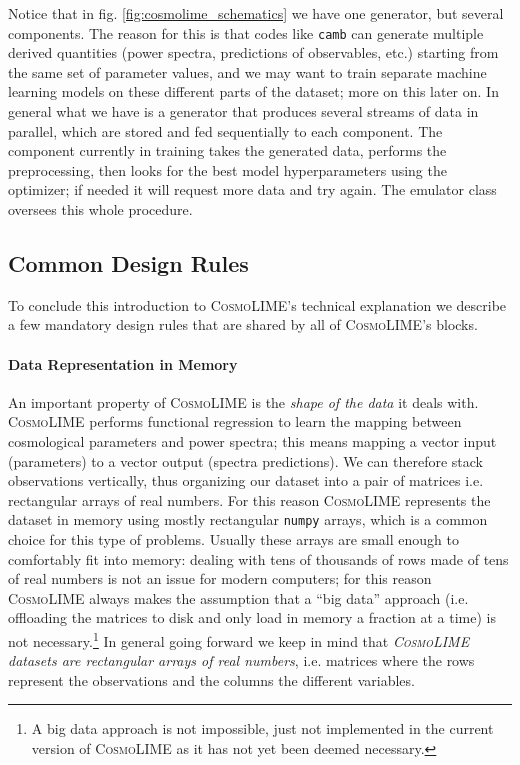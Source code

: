 Notice that in fig. \ref{fig:cosmolime_schematics} we have one generator, but several components. The reason for this is that codes like \texttt{camb} can generate multiple derived quantities (power spectra, predictions of observables, etc.) starting from the same set of parameter values, and we may want to train separate machine learning models on these different parts of the dataset; more on this later on. In general what we have is a generator that produces several streams of data in parallel, which are stored and fed sequentially to each component. The component currently in training takes the generated data, performs the preprocessing, then looks for the best model hyperparameters using the optimizer; if needed it will request more data and try again. The emulator class oversees this whole procedure.

\subsection{Common Design Rules}\label{subsec:common_design_rules}
To conclude this introduction to \textsc{CosmoLIME}'s technical explanation we describe a few mandatory design rules that are shared by all of \textsc{CosmoLIME}'s blocks.

\paragraph{Data Representation in Memory}
An important property of \textsc{CosmoLIME} is the \emph{shape of the data} it deals with. 
\textsc{CosmoLIME} performs functional regression to learn the mapping between cosmological parameters and power spectra; this means mapping a vector input (parameters) to a vector output (spectra predictions). We can therefore stack observations vertically, thus organizing our dataset into a pair of matrices i.e. rectangular arrays of real numbers. For this reason \textsc{CosmoLIME} represents the dataset in memory using mostly rectangular \texttt{numpy} arrays, which is a common choice for this type of problems.
Usually these arrays are small enough to comfortably fit into memory: dealing with tens of thousands of rows made of tens of real numbers is not an issue for modern computers; for this reason \textsc{CosmoLIME} always makes the assumption that a ``big data'' approach (i.e. offloading the matrices to disk and only load in memory a fraction at a time) is not necessary.\footnote{A big data approach is not impossible, just not implemented in the current version of \textsc{CosmoLIME} as it has not yet been deemed necessary.}
In general going forward we keep in mind that \emph{\textsc{CosmoLIME} datasets are rectangular arrays of real numbers}, i.e. matrices where the rows represent the observations and the columns the different variables.

